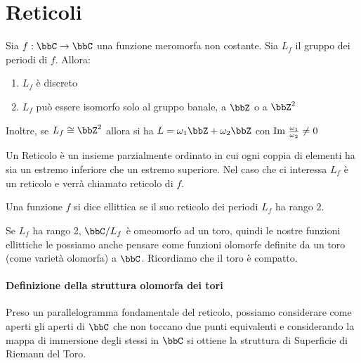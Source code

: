 \section{Reticoli}
Sia $f: \bbC \rar \bbC$ una funzione meromorfa non costante. Sia $L_f$ il gruppo dei periodi di $f$. Allora:
\begin{enumerate}
\item $L_f$ è discreto 
\item $L_f$ può essere isomorfo solo al gruppo banale, a $\bbZ$ o a $\bbZ^2$
\end{enumerate}
Inoltre, se $L_f \cong \bbZ^2$ allora si ha $L = \omega_1 \bbZ + \omega_2 \bbZ$ con $\text{Im } \frac{\omega_1}{\omega_2} \neq 0$

\begin{definizione}[Reticolo]
  Un Reticolo è un insieme parzialmente ordinato in cui ogni coppia di elementi ha sia un estremo inferiore che un estremo superiore. Nel caso che ci interessa $L_f$ è un reticolo e verrà chiamato reticolo di $f$.
\end{definizione}

\begin{definizione}
  Una funzione $f$ si dice ellittica se il suo reticolo dei periodi $L_f$ ha rango $2$.
\end{definizione}

\begin{osservazione}
  Se $L_f$ ha rango 2, $\bbC / L_f$ è omeomorfo ad un toro, quindi le nostre funzioni ellittiche le possiamo anche pensare come funzioni olomorfe definite da un toro (come varietà olomorfa) a $\bbC$. Ricordiamo che il toro è compatto.
\end{osservazione}

\paragraph{Definizione della struttura olomorfa dei tori}
Preso un parallelogramma fondamentale del reticolo, possiamo considerare come aperti gli aperti di $\bbC$ che non toccano due punti equivalenti e considerando la mappa di immersione degli stessi in $\bbC$ si ottiene la struttura di Superficie di Riemann del Toro.


